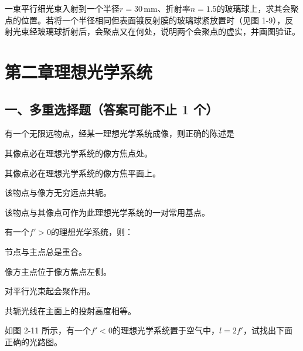 \documentclass[padl, analysis, notocnum]{ExBook}
\newcommand{\answerarea}[1][3.5cm]{%
  \par\vspace{1mm}%
  \noindent{\color{themeColor!35}\rule{\linewidth}{0.4pt}}\par
  \noindent\begin{minipage}[t][#1][t]{\linewidth}\vspace{0pt}\end{minipage}\par
  \noindent{\color{themeColor!35}\rule{\linewidth}{0.4pt}}\par
}
\begin{document}
\begin{qitems}[startnum=10]
\qitem 一束平行细光束入射到一个半径$r=30\,\mathrm{mm}$、折射率$n=1.5$的玻璃球上，求其会聚点的位置。若将一个半径相同但表面镀反射膜的玻璃球紧放置时（见图 1-9），反射光束经玻璃球折射后，会聚点又在何处，说明两个会聚点的虚实，并画图验证。
\label{q:17:start}
\answerarea[7.0cm]
\label{q:17:end}
\end{qitems}

\section{第二章\quad 理想光学系统}
\subsection{一、多重选择题（答案可能不止 1 个）}
\begin{qitems}[startnum=1]
\qitem 有一个无限远物点，经某一理想光学系统成像，则正确的陈述是
\par\noindent\hspace{2em}其像点必在理想光学系统的像方焦点处。
\par\noindent\hspace{2em}其像点必在理想光学系统的像方焦平面上。
\par\noindent\hspace{2em}该物点与像方无穷远点共轭。
\par\noindent\hspace{2em}该物点与其像点可作为此理想光学系统的一对常用基点。
\label{q:18:start}
\answerarea[4.0cm]
\label{q:18:end}
\end{qitems}

\begin{qitems}[startnum=2]
\qitem 有一个$f'>0$的理想光学系统，则：
\par\noindent\hspace{2em}节点与主点总是重合。
\par\noindent\hspace{2em}像方主点位于像方焦点左侧。
\par\noindent\hspace{2em}对平行光束起会聚作用。
\par\noindent\hspace{2em}共轭光线在主面上的投射高度相等。
\label{q:19:start}
\answerarea[4.0cm]
\label{q:19:end}
\end{qitems}

\begin{qitems}[startnum=3]
\qitem 如图 2-11 所示，有一个$f'<0$的理想光学系统置于空气中，$l=2f'$，试找出下面正确的光路图。
\label{q:20:start}
\answerarea[1.6cm]
\label{q:20:end}
\end{qitems}
\end{document}
